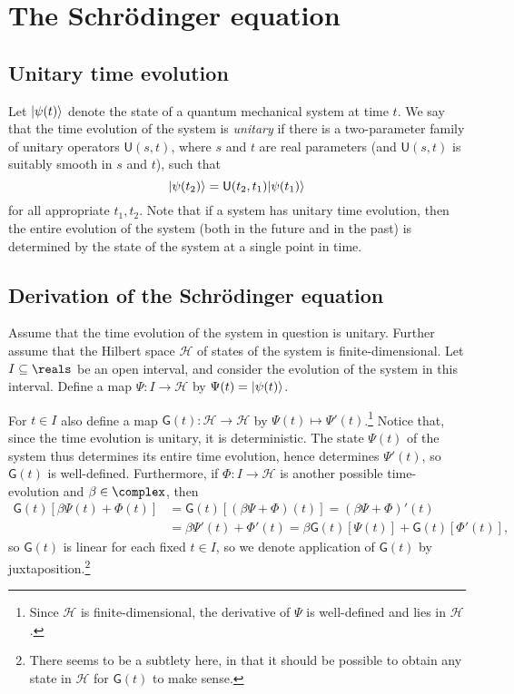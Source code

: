 \documentclass[article, a4paper, 11pt, oneside]{memoir}
\numberwithin{equation}{chapter}
\newcommand{\calH}{\mathcal{H}}
\DeclarePairedDelimiter{\ket}{\lvert}{\rangle}
\newcommand{\op}[1]{\mathsf{#1}}
\begin{document}
\chapter{The Schrödinger equation}

\section{Unitary time evolution}

Let $\ket{\psi(t)}$ denote the state of a quantum mechanical system at time $t$. We say that the time evolution of the system is \emph{unitary} if there is a two-parameter family of unitary operators $\op{U}(s,t)$, where $s$ and $t$ are real parameters (and $\op{U}(s,t)$ is suitably smooth in $s$ and $t$), such that
%
\begin{equation*}
    \ket{\psi(t_2)} = \op{U}(t_2,t_1) \ket{\psi(t_1)}
\end{equation*}
%
for all appropriate $t_1, t_2$. Note that if a system has unitary time evolution, then the entire evolution of the system (both in the future and in the past) is determined by the state of the system at a single point in time.


\section{Derivation of the Schrödinger equation}

Assume that the time evolution of the system in question is unitary. Further assume that the Hilbert space $\calH$ of states of the system is finite-dimensional. Let $I \subseteq \reals$ be an open interval, and consider the evolution of the system in this interval. Define a map $\Psi \colon I \to \calH$ by $\Psi(t) = \ket{\psi(t)}$.

For $t \in I$ also define a map $\op{G}(t) \colon \calH \to \calH$ by $\Psi(t) \mapsto \Psi'(t)$.\footnote{Since $\calH$ is finite-dimensional, the derivative of $\Psi$ is well-defined and lies in $\calH$.} Notice that, since the time evolution is unitary, it is deterministic. The state $\Psi(t)$ of the system thus determines its entire time evolution, hence determines $\Psi'(t)$, so $\op{G}(t)$ is well-defined. Furthermore, if $\Phi \colon I \to \calH$ is another possible time-evolution and $\beta \in \complex$, then
%
\begin{align*}
    \op{G}(t)[\beta \Psi(t) + \Phi(t)]
        &= \op{G}(t)[(\beta \Psi + \Phi)(t)]
         = (\beta \Psi + \Phi)'(t) \\
        &= \beta \Psi'(t) + \Phi'(t)
         = \beta \op{G}(t)[\Psi(t)] + \op{G}(t)[\Phi'(t)],
\end{align*}
%
so $\op{G}(t)$ is linear for each fixed $t \in I$, so we denote application of $\op{G}(t)$ by juxtaposition.\footnote{There seems to be a subtlety here, in that it should be possible to obtain any state in $\calH$ for $\op{G}(t)$ to make sense.}
\end{document}
